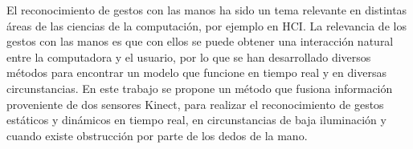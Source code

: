 
El reconocimiento de gestos con las manos ha sido un tema relevante en distintas áreas de las ciencias de la computación, por ejemplo en HCI. La relevancia de los gestos con las manos es que con ellos se puede obtener una interacción natural entre la computadora y el usuario, por lo que se han desarrollado diversos m\'etodos para encontrar un modelo que funcione en tiempo real y en diversas circunstancias. En este trabajo se propone un método que fusiona información proveniente de dos sensores Kinect, para realizar el reconocimiento de gestos estáticos y dinámicos en tiempo real, en circunstancias de baja iluminación y cuando existe obstrucción por parte de los dedos de la mano.